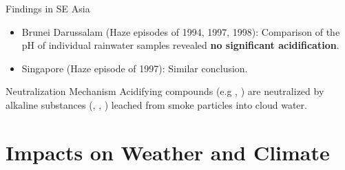 \documentclass[
11pt,notheorems,hyperref={pdfauthor=whatever}
]{beamer}
\begin{document}
\begin{frame}
    \begin{block}{Findings in SE Asia}
        \begin{itemize}
            \item Brunei Darussalam (Haze episodes of 1994, 1997, 1998): Comparison of the pH of individual rainwater samples revealed \textbf{no significant acidification}.
            \item Singapore (Haze episode of 1997): Similar conclusion.
        \end{itemize}
    \end{block}

    \begin{block}{Neutralization Mechanism}
        Acidifying compounds (e.g , ) are neutralized by alkaline substances (, , ) leached from smoke particles into cloud water.
    \end{block}

\end{frame}

\section{Impacts on Weather and Climate}
\end{document}
